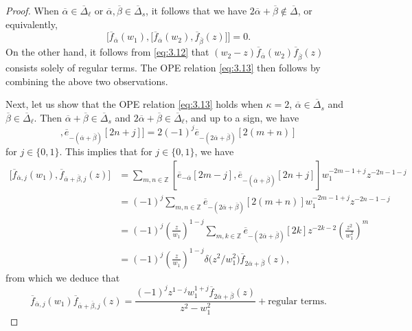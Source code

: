 \documentclass[pdftex]{sigma}
\numberwithin{equation}{section}
\begin{document}
\begin{proof}
When $\overline{\alpha}\in\overline{\Delta}_{\ell}$ or $\overline{\alpha},\overline{\beta}\in\overline{\Delta}_s$, it follows that we have $2\overline{\alpha}+\overline{\beta} \notin\overline{\Delta}$, or equivalently,
\begin{equation*}
\bigl[\overline{f}_{\overline{\alpha}}(w_1),\bigl[\overline{f}_{\overline{\alpha}}(w_2), \overline{f}_{\overline{\beta}}(z)\bigr]\bigr]=0.
\end{equation*}
On the other hand, it follows from \eqref{eq:3.12} that $(w_2-z)\overline{f}_{\overline{\alpha}}(w_2) \overline{f}_{\overline{\beta}}(z)$ consists solely of regular terms. The OPE relation \eqref{eq:3.13} then follows by combining the above two observations.

Next, let us show that the OPE relation \eqref{eq:3.13} holds when $\kappa=2$, $\overline{\alpha}\in\overline{\Delta}_s$ and $\overline{\beta}\in\overline{\Delta}_{\ell}$. Then $\overline{\alpha}+\overline{\beta}\in\overline{\Delta}_s$ and $2\overline{\alpha}+\overline{\beta}\in\overline{\Delta}_{\ell}$, and up to a sign, we have
\begin{equation*}
[\overline{e}_{-\overline{\alpha}}[2m-j],\overline{e}_{-(\overline{\alpha}+\overline{\beta})}[2n+j]]
=2(-1)^j\overline{e}_{-(2\overline{\alpha}+\overline{\beta})}[2(m+n)]
\end{equation*}
for $j\in\{0,1\}$. This implies that for $j\in\{0,1\}$, we have
\begin{align*}
\bigl[\overline{f}_{\overline{\alpha},j}(w_1), \overline{f}_{\overline{\alpha}+\overline{\beta},j}(z)\bigr]
&=\sum_{m,n\in\mathbb{Z}}[\overline{e}_{-\overline{\alpha}}[2m-j],\overline{e}_{-(\overline{\alpha}+\overline{\beta})}[2n+j]] w_1^{-2m-1+j}z^{-2n-1-j}\\
&=(-1)^j\sum_{m,n\in\mathbb{Z}}\overline{e}_{-(2\overline{\alpha}+\overline{\beta})}[2(m+n)]w_1^{-2m-1+j} z^{-2n-1-j}\\
&=(-1)^j\left(\frac{z}{w_1}\right)^{1-j} \sum_{m,k\in\mathbb{Z}}\overline{e}_{-(2\overline{\alpha}+ \overline{\beta})}[2k]z^{-2k-2}\left(\frac{z^2}{w_1^2} \right)^m\\
&=(-1)^j\left(\frac{z}{w_1}\right)^{1-j}\delta\big(z^2/w_1^2\big) \overline{f}_{2\overline{\alpha}+\overline{\beta}}(z),
\end{align*}
from which we deduce that
\begin{equation}\label{eq:3.14}
\overline{f}_{\overline{\alpha},j}(w_1)\overline{f}_{\overline{\alpha}+\overline{\beta},j}(z)
=\frac{(-1)^jz^{1-j}w_1^{1+j}\overline{f}_{2\overline{\alpha}+ \overline{\beta}}(z)}{z^2-w_1^2}+\text{regular terms}.

\end{equation}
\end{proof}
\end{document}
